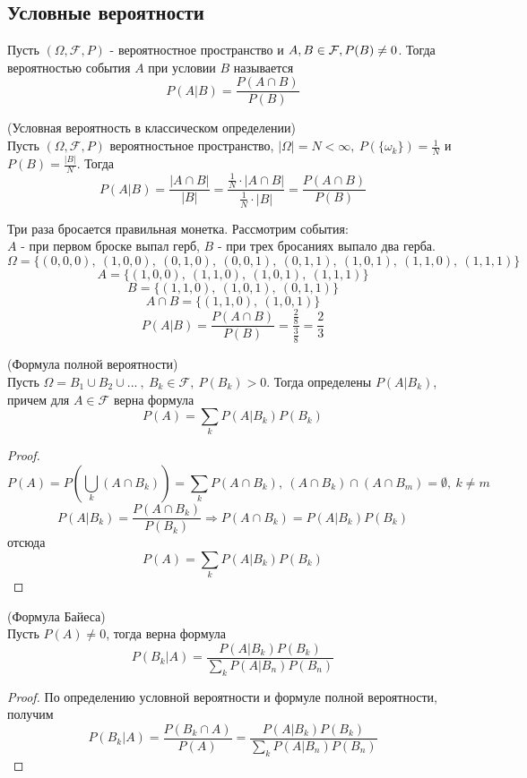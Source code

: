 \documentclass[a4paper, 12pt]{article}
\begin{document}
\subsection{Условные вероятности}
\begin{definition}
    Пусть $(\Omega, \mathcal{F}, P)$ - вероятностное пространство и $A,B\in \mathcal{F},\\
    P(B)\ne 0$. Тогда вероятностью события $A$ при условии $B$ называется
    \[P(A|B)=\frac{P(A\cap B)}{P(B)}\]
\end{definition}
\begin{definition} (Условная вероятность в классическом определении)\\
    Пусть $(\Omega, \mathcal{F}, P)$ вероятностьное пространство, $|\Omega|=N<\infty,\ P(\{\omega_k\})=\frac{1}{N}$ и $P(B)=\frac{|B|}{N}$. Тогда
    \[P(A|B)=\frac{|A\cap B|}{|B|}=\frac{\frac{1}{N}\cdot |A\cap B|}{\frac{1}{N}\cdot |B|}=\frac{P(A\cap B)}{P(B)}\]
\end{definition}
\begin{example}
    Три раза бросается правильная монетка. Рассмотрим события:\\
    $A$ - при первом броске выпал герб, $B$ - при трех бросаниях выпало два герба.
    \[\Omega=\{(0,0,0),\ (1,0,0),\ (0,1,0),\ (0,0,1),\ (0,1,1),\ (1,0,1),\ (1,1,0),\ (1,1,1)\}\]
    \[A=\{(1,0,0),\ (1,1,0),\ (1,0,1),\ (1,1,1)\}\] 
    \[B=\{(1,1,0),\ (1,0,1),\ (0,1,1)\}\]
    \[A\cap B=\{(1,1,0),\ (1,0,1)\}\]
    \[P(A|B)=\frac{P(A\cap B)}{P(B)}=\frac{\frac{2}{8}}{\frac{3}{8}}=\frac{2}{3}\]
\end{example}
\begin{theorem} (Формула полной вероятности)\\
    Пусть $\Omega=B_1\cup B_2\cup...\ ,\ B_k\in \mathcal{F},\ P(B_k)>0$. Тогда определены $P(A|B_k)$, причем для $A\in \mathcal{F}$ верна формула
    \[P(A)=\sum\limits_{k}P(A|B_k)P(B_k)\]
\end{theorem}
\begin{proof}
    \[P(A)=P\left(\bigcup\limits_k (A\cap B_k)\right)=\sum\limits_{k}P(A\cap B_k),\ (A\cap B_k)\cap (A\cap B_m) = \emptyset,\ k\ne m\]
    \[P(A|B_k)=\frac{P(A\cap B_k)}{P(B_k)} \Rightarrow P(A\cap B_k)=P(A|B_k)P(B_k)\]
    отсюда
    \[P(A)=\sum\limits_{k}P(A|B_k)P(B_k)\]
\end{proof}
\begin{theorem} (Формула Байеса)\\
    Пусть $P(A)\ne 0$, тогда верна формула
    \[P(B_k|A)=\frac{P(A|B_k)P(B_k)}{\sum\limits_{k}P(A|B_n)P(B_n)}\]
\end{theorem}
\begin{proof}
    По определению условной вероятности и формуле полной вероятности, получим
    \[P(B_k|A)=\frac{P(B_k\cap A)}{P(A)}=\frac{P(A|B_k)P(B_k)}{\sum\limits_{k}P(A|B_n)P(B_n)}\]
\end{proof}
\end{document}
